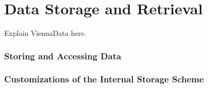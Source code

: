 \chapter{Data Storage and Retrieval} \label{chap:data}

Explain ViennaData here.


\subsection{Storing and Accessing Data}



\subsection{Customizations of the Internal Storage Scheme}



